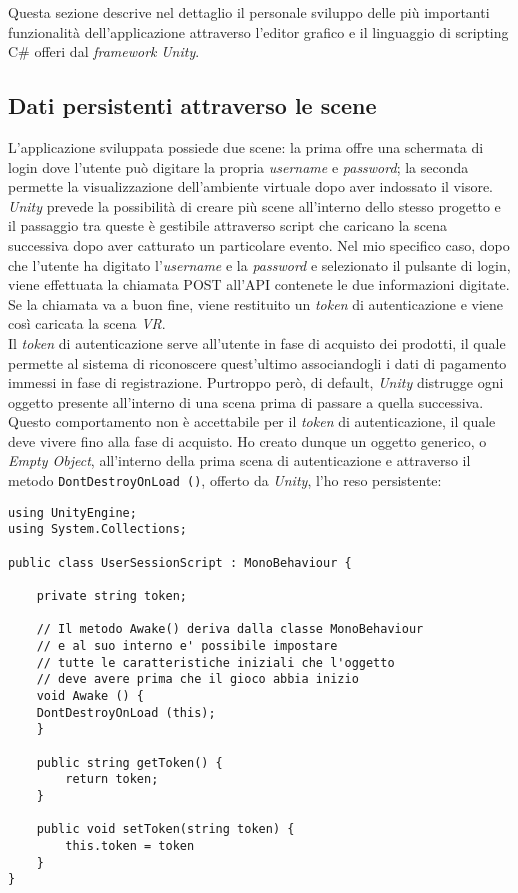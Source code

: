 Questa sezione descrive nel dettaglio il personale sviluppo delle più importanti funzionalità dell'applicazione attraverso l'editor grafico e il linguaggio di scripting C\# offeri dal \textit{framework} \textit{Unity}.


\subsection{Dati persistenti attraverso le scene}

L'applicazione sviluppata possiede due scene: la prima offre una schermata di login dove l'utente può digitare la propria \textit{username} e \textit{password}; la seconda permette la visualizzazione dell'ambiente virtuale dopo aver indossato il visore. \textit{Unity} prevede la possibilità di creare più scene all'interno dello stesso progetto e il passaggio tra queste è gestibile attraverso script che caricano la scena successiva dopo aver catturato un particolare evento. Nel mio specifico caso, dopo che l'utente ha digitato l'\textit{username} e la \textit{password} e selezionato il pulsante di login, viene effettuata la chiamata POST all'API contenete le due informazioni digitate. Se la chiamata va a buon fine, viene restituito un \textit{token} di autenticazione e viene così caricata la scena \textit{VR}. \\
Il \textit{token} di autenticazione serve all'utente in fase di acquisto dei prodotti, il quale permette al sistema di riconoscere quest'ultimo associandogli i dati di pagamento immessi in fase di registrazione. Purtroppo però, di default, \textit{Unity} distrugge ogni oggetto presente all'interno di una scena prima di passare a quella successiva. Questo comportamento non è accettabile per il \textit{token} di autenticazione, il quale deve vivere fino alla fase di acquisto. Ho creato dunque un oggetto generico, o \textit{Empty Object}, all'interno della prima scena di autenticazione e attraverso il metodo \texttt{DontDestroyOnLoad ()}, offerto da \textit{Unity}, l'ho reso persistente:

\begin{lstlisting}[style=MyCStyle]
using UnityEngine;
using System.Collections;

public class UserSessionScript : MonoBehaviour {

	private string token;

	// Il metodo Awake() deriva dalla classe MonoBehaviour
	// e al suo interno e' possibile impostare
	// tutte le caratteristiche iniziali che l'oggetto
	// deve avere prima che il gioco abbia inizio
	void Awake () {
	DontDestroyOnLoad (this);
	}
	
	public string getToken() {
		return token;
	}
	
	public void setToken(string token) {
		this.token = token
	}
}
\end{lstlisting}

